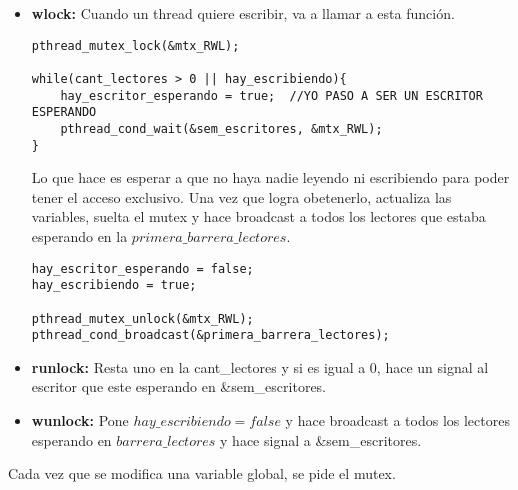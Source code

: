 \begin{itemize}
\item{\textbf{wlock: }}Cuando un thread quiere escribir, va a llamar a esta función. 
\begin{lstlisting}
pthread_mutex_lock(&mtx_RWL);

while(cant_lectores > 0 || hay_escribiendo){
	hay_escritor_esperando = true;	//YO PASO A SER UN ESCRITOR ESPERANDO
	pthread_cond_wait(&sem_escritores, &mtx_RWL);
}
\end{lstlisting}
Lo que hace es esperar a que no haya nadie leyendo ni escribiendo para poder tener el acceso exclusivo.
Una vez que logra obetenerlo, actualiza las variables, suelta el mutex y hace broadcast a todos los lectores que estaba esperando en la
$primera\_barrera\_lectores$.
\begin{lstlisting}
hay_escritor_esperando = false;
hay_escribiendo = true;	

pthread_mutex_unlock(&mtx_RWL);
pthread_cond_broadcast(&primera_barrera_lectores);
\end{lstlisting}

\item{\textbf{runlock: }}Resta uno en la cant\_lectores y si es igual a 0, hace un signal al escritor que este esperando en \&sem\_escritores. 

\item{\textbf{wunlock: }}Pone $hay\_escribiendo = false$ y hace broadcast a todos los lectores esperando en $barrera\_lectores$ y hace signal a \&sem\_escritores.
\end{itemize}
Cada vez que se modifica una variable global, se pide el mutex.

